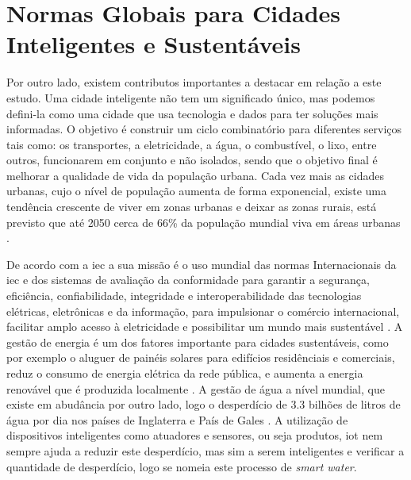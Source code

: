 \section{Normas Globais para Cidades Inteligentes e Sustentáveis}
\label{sec:normas_globais_cidades_inteligentes_sustentaveis}
Por outro lado, existem contributos importantes a destacar em relação a este estudo.
Uma cidade inteligente não tem um significado único, mas podemos defini-la como uma cidade que usa tecnologia e dados para ter soluções mais informadas. O objetivo é construir um ciclo combinatório para diferentes serviços tais como: os transportes, a eletricidade, a água, o combustível, o lixo,  entre outros, funcionarem em conjunto e não isolados, sendo que o objetivo final é melhorar a qualidade de vida da população urbana.
Cada vez mais as cidades urbanas, cujo o nível de população aumenta de forma exponencial, existe uma tendência crescente de viver em zonas urbanas e deixar as zonas rurais, está previsto que até 2050 cerca de 66\% da população mundial viva em áreas urbanas \cite{article}.

De acordo  com a \gls{iec} a sua missão é o uso mundial das normas Internacionais da \gls{iec} e dos sistemas de avaliação da conformidade para garantir a segurança, eficiência, confiabilidade, integridade e  interoperabilidade das tecnologias elétricas, eletrônicas e da informação, para impulsionar o comércio internacional, facilitar amplo acesso à eletricidade e possibilitar um mundo mais sustentável \cite{IEC}.
A gestão de energia é um dos fatores importante para cidades sustentáveis, como por exemplo o aluguer de painéis solares para edifícios residênciais e comerciais, reduz o consumo de energia elétrica da rede pública, e aumenta a energia renovável que é produzida localmente \cite{EnergiaSolar}.
A gestão de água a nível mundial, que existe em abudância por outro lado, logo o desperdício de 3.3 bilhões de litros de água por dia nos países de Inglaterra e País de Gales \cite{article}.
A utilização de dispositivos inteligentes como atuadores e sensores, ou seja produtos, \gls{iot} nem sempre ajuda a reduzir este desperdício, mas sim a serem inteligentes e verificar a quantidade de desperdício, logo se nomeia este processo de \textit{smart water}\cite{article}.

